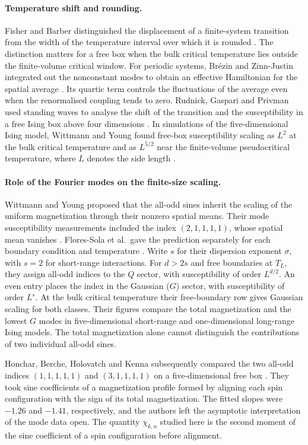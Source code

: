 \documentclass[11pt]{article}
\numberwithin{equation}{section}
\begin{document}
\paragraph{Temperature shift and rounding.}
Fisher and Barber distinguished the displacement of a finite-system
transition from the width of the temperature interval over which it is
rounded \cite{fisher-barber}. The distinction matters for a free box
when the bulk critical temperature lies outside the finite-volume
critical window. For periodic systems, Br\'ezin and Zinn-Justin
integrated out the nonconstant modes to obtain an effective Hamiltonian
for the spatial average \cite{brezin-zinnjustin}. Its quartic term
controls the fluctuations of the average even when the renormalised
coupling tends to zero. Rudnick, Gaspari and Privman used standing
waves to analyse the shift of the transition and the susceptibility in
a free Ising box above four dimensions \cite{rudnick}. In simulations
of the five-dimensional Ising model, Wittmann and Young found free-box
susceptibility scaling as $L^2$ at the bulk critical temperature and as
$L^{5/2}$ near the finite-volume pseudocritical temperature, where $L$
denotes the side length \cite{wittmann}.

\paragraph{Role of the Fourier modes on the finite-size scaling.}
Wittmann and Young proposed that the all-odd sines inherit the scaling
of the uniform magnetization through their nonzero spatial means.
Their mode susceptibility measurements included the index $(2,1,1,1,1)$,
whose spatial mean vanishes \cite[Sec.~V.B]{wittmann}.
Flores-Sola et al.\ gave the prediction separately for each boundary
condition and temperature \cite[Table~I]{flores}. Write $s$ for their
dispersion exponent $\sigma$, with $s=2$ for short-range interactions.
For $d>2s$ and free boundaries at $T_L$, they assign all-odd indices
to the $Q$ sector, with susceptibility of order $L^{d/2}$. An even
entry places the index in the Gaussian ($G$) sector, with susceptibility
of order $L^s$. At the bulk critical temperature their free-boundary
row gives Gaussian scaling for both classes. Their figures compare
the total magnetization and the lowest $G$ modes in five-dimensional
short-range and one-dimensional long-range Ising models.
The total magnetization alone cannot distinguish the contributions of
two individual all-odd sines.

Honchar, Berche, Holovatch and Kenna subsequently compared the two
all-odd indices $(1,1,1,1,1)$ and $(3,1,1,1,1)$ on a five-dimensional
free box \cite[Fig.~7]{honchar}. They took sine coefficients of a
magnetization profile formed by aligning each spin configuration with
the sign of its total magnetization. The fitted slopes were $-1.26$
and $-1.41$, respectively, and the authors left the asymptotic
interpretation of the mode data open. The quantity $\chi_{k,n}$ studied
here is the second moment of the sine coefficient of a spin
configuration before alignment.
\end{document}
